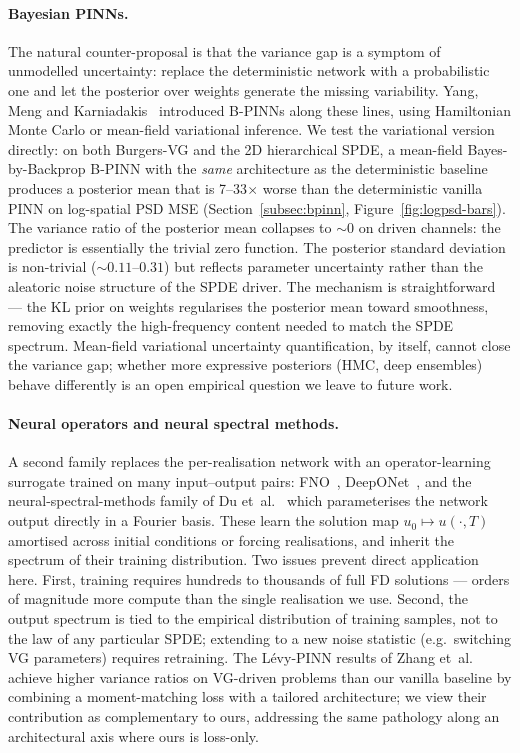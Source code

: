 \documentclass[review,12pt]{elsarticle}
\begin{document}
\paragraph{Bayesian PINNs.}
The natural counter-proposal is that the variance gap is a symptom of
unmodelled uncertainty: replace the deterministic network with a
probabilistic one and let the posterior over weights generate the
missing variability. Yang, Meng and
Karniadakis~\cite{YangMengKarniadakis2021} introduced B-PINNs along
these lines, using Hamiltonian Monte Carlo or mean-field variational
inference. We test the variational version directly: on both
Burgers-VG and the 2D hierarchical SPDE, a mean-field
Bayes-by-Backprop B-PINN with the \emph{same} architecture as the
deterministic baseline produces a posterior mean that is
7--33\(\times\) worse than the deterministic vanilla PINN on
log-spatial PSD MSE (Section~\ref{subsec:bpinn},
Figure~\ref{fig:logpsd-bars}). The variance ratio of the posterior
mean collapses to \(\sim 0\) on driven channels: the predictor is
essentially the trivial zero function. The posterior standard
deviation is non-trivial (\(\sim 0.11\)--\(0.31\)) but reflects
parameter uncertainty rather than the aleatoric noise structure of
the SPDE driver. The mechanism is straightforward --- the KL prior
on weights regularises the posterior mean toward smoothness,
removing exactly the high-frequency content needed to match the SPDE
spectrum. Mean-field variational uncertainty quantification, by
itself, cannot close the variance gap; whether more expressive
posteriors (HMC, deep ensembles) behave differently is an open
empirical question we leave to future work.

\paragraph{Neural operators and neural spectral methods.}
A second family replaces the per-realisation network with an
operator-learning surrogate trained on many input--output pairs:
FNO~\cite{Li2021FNO}, DeepONet~\cite{Lu2021DeepONet}, and the
neural-spectral-methods family of Du et~al.~\cite{DuEtAl2024NSM}
which parameterises the network output directly in a Fourier basis.
These learn the solution map \(u_0 \mapsto u(\cdot, T)\) amortised
across initial conditions or forcing realisations, and inherit the
spectrum of their training distribution. Two issues prevent direct
application here. First, training requires hundreds to thousands of
full FD solutions --- orders of magnitude more compute than the
single realisation we use. Second, the output spectrum is tied to
the empirical distribution of training samples, not to the law of
any particular SPDE; extending to a new noise statistic (e.g.\
switching VG parameters) requires retraining. The L\'evy-PINN
results of Zhang et~al.~\cite{ZhangEtAl2025LevyPINN} achieve higher
variance ratios on VG-driven problems than our vanilla baseline by
combining a moment-matching loss with a tailored architecture; we
view their contribution as complementary to ours, addressing the
same pathology along an architectural axis where ours is loss-only.
\end{document}
